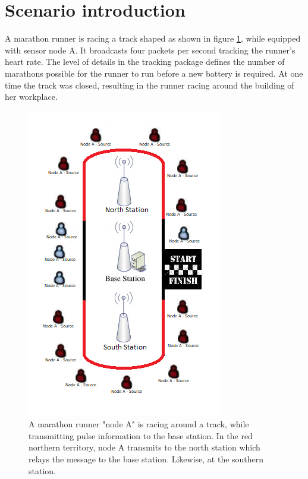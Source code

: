 \section{Scenario introduction}\label{sc:scenarioIntroduction}
A marathon runner is racing a track shaped as shown in figure \ref{fig:scenarioIntroduction}, while equipped with sensor node A. It broadcasts four packets per second tracking the runner’s heart rate. The level of details in the tracking package defines the number of marathons possible for the runner to run before a new battery is required. At one time the track was closed, resulting in the runner racing around the building of her workplace.

\begin{figure}[H]
	\centering
	\includegraphics[width=\linewidth]{introduction/scenario/fig/scenarioIntroduction.png}
	\caption{A marathon runner "node A" is racing around a track, while transmitting pulse information to the base station. In the red northern territory, node A transmits to the north station which relays the message to the base station. Likewise, at the southern station.}
	\label{fig:scenarioIntroduction}
\end{figure}

